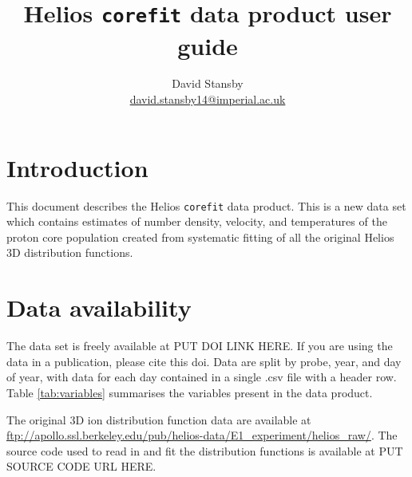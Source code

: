 \documentclass[11pt,a4paper]{article}
\begin{document}
\title{Helios \texttt{corefit} data product user guide}
\author{David Stansby \\
\href{mailto:david.stansby14@imperial.ac.uk}{david.stansby14@imperial.ac.uk}}
\date{}
\maketitle

\section{Introduction}
This document describes the Helios \texttt{corefit} data product. This is a new data set which contains estimates of number density, velocity, and temperatures of the proton core population created from systematic fitting of all the original Helios 3D distribution functions.

\section{Data availability}
The data set is freely available at PUT DOI LINK HERE. If you are using the data in a publication, please cite this doi. Data are split by probe, year, and day of year, with data for each day contained in a single .csv file with a header row. Table \ref{tab:variables} summarises the variables present in the data product.

The original 3D ion distribution function data are available at \url{ftp://apollo.ssl.berkeley.edu/pub/helios-data/E1_experiment/helios_raw/}. The source code used to read in and fit the distribution functions is available at PUT SOURCE CODE URL HERE.
\end{document}
